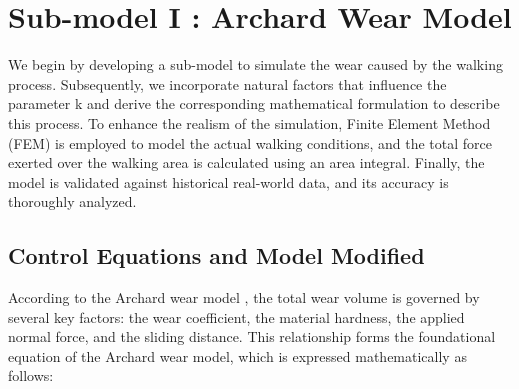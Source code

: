 \documentclass{mcmthesis}
\begin{document}






\section{Sub-model I : Archard Wear Model}

\hspace{1.5em}We begin by developing a sub-model to simulate the wear caused by the walking process. Subsequently, we incorporate natural factors that influence the parameter k and derive the corresponding mathematical formulation to describe this process. To enhance the realism of the simulation, Finite Element Method (FEM) is employed to model the actual walking conditions, and the total force exerted over the walking area is calculated using an area integral. Finally, the model is validated against historical real-world data, and its accuracy is thoroughly analyzed.


\subsection{Control Equations and Model Modified}

\hspace{1.5em}According to the Archard wear model \cite{1}, the total wear volume is governed by several key factors: the wear coefficient, the material hardness, the applied normal force, and the sliding distance. This relationship forms the foundational equation of the Archard wear model, which is expressed mathematically as follows:
\end{document}
